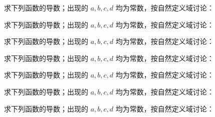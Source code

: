 \newpage
\noindent\begin{minipage}{\textwidth}
求下列函数的导数；出现的 $a,b,c,d$ 均为常数，按自然定义域讨论：
\end{minipage}\par\vfill
\noindent\begin{minipage}{\textwidth}
求下列函数的导数；出现的 $a,b,c,d$ 均为常数，按自然定义域讨论：
\end{minipage}\par\vfill
\noindent\begin{minipage}{\textwidth}
求下列函数的导数；出现的 $a,b,c,d$ 均为常数，按自然定义域讨论：
\end{minipage}\par\vfill
\newpage
\noindent\begin{minipage}{\textwidth}
求下列函数的导数；出现的 $a,b,c,d$ 均为常数，按自然定义域讨论：
\end{minipage}\par\vfill
\noindent\begin{minipage}{\textwidth}
求下列函数的导数；出现的 $a,b,c,d$ 均为常数，按自然定义域讨论：
\end{minipage}\par\vfill
\noindent\begin{minipage}{\textwidth}
求下列函数的导数；出现的 $a,b,c,d$ 均为常数，按自然定义域讨论：
\end{minipage}\par\vfill
\newpage
\noindent\begin{minipage}{\textwidth}
求下列函数的导数；出现的 $a,b,c,d$ 均为常数，按自然定义域讨论：
\end{minipage}\par\vfill
